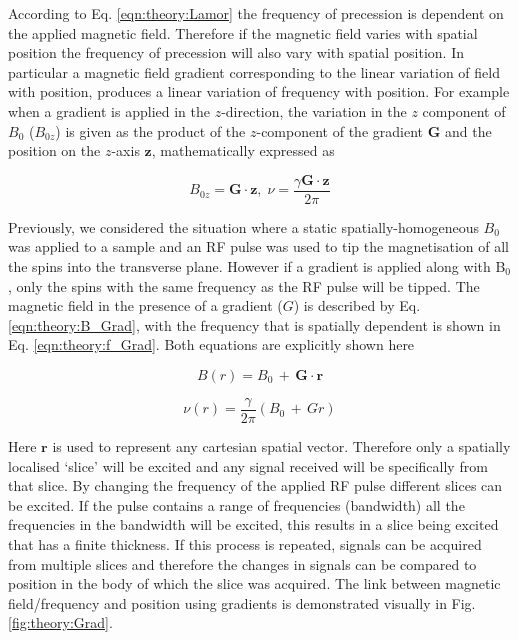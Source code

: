 According to Eq. \ref{eqn:theory:Lamor} the frequency of precession is dependent on the applied magnetic field. Therefore if the magnetic field varies with spatial position the frequency of precession will also vary with spatial position. In particular a magnetic field gradient corresponding to the linear variation of field with position, produces a linear variation of frequency with position. For example when a gradient is applied in the $z$-direction, the variation in the $z$ component of $B_0$ ($B_{0z}$) is given as the product of the $z$-component of the gradient $\mathbf{G}$ and the position on the $z$-axis $\mathbf{z}$, mathematically expressed as

\begin{equation}
    B_{0z} = \mathbf{G}\cdot \mathbf{z},\; \nu = \frac{\gamma \mathbf{G} \cdot \mathbf{z}}{2\pi} 
\end{equation}

Previously, we considered the situation where a static spatially-homogeneous $B_0$ was applied to a sample and an \ac{RF} pulse was used to tip the magnetisation of all the spins into the transverse plane. However if a gradient is applied along with B$_0$, only the spins with the same frequency as the \ac{RF} pulse will be tipped. The magnetic field in the presence of a gradient ($G$) is described by Eq. \ref{eqn:theory:B_Grad}, with the frequency that is spatially dependent is shown in Eq. \ref{eqn:theory:f_Grad}. Both equations are explicitly shown here

\begin{equation}
    B(r) = B_0 \, + \, \mathbf{G} \cdot \mathbf{r}
    \label{eqn:theory:B_Grad}
\end{equation}

\begin{equation}
    \nu(r) = \frac{\gamma}{2\pi}(B_0 \, + \, Gr)
    \label{eqn:theory:f_Grad}
\end{equation}

\noindent Here $\mathbf{r}$ is used to represent any cartesian spatial vector. Therefore only a spatially localised `slice' will be excited and any signal received will be specifically from that slice. By changing the frequency of the applied \ac{RF} pulse different slices can be excited. If the pulse contains a range of frequencies (bandwidth) all the frequencies in the bandwidth will be excited, this results in a slice being excited that has a finite thickness. If this process is repeated, signals can be acquired from multiple slices and therefore the changes in signals can be compared to position in the body of which the slice was acquired. The link between magnetic field/frequency and position using gradients is demonstrated visually in Fig. \ref{fig:theory:Grad}.

